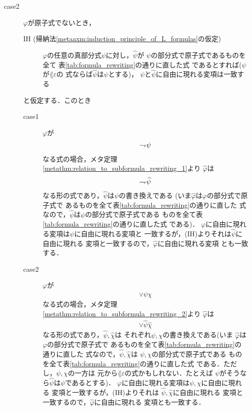 \begin{metaprf}
\begin{description}
\begin{description}
					\item[case2] $\varphi$が原子式でないとき，
						\begin{description}
							\item[IH (帰納法\ref{metaaxm:induction_principle_of_L_formulas}の仮定)]
								$\varphi$の任意の真部分式$\psi$に対し，$\widehat{\psi}$が
								$\psi$の部分式で原子式であるものを全て
								表\ref{tab:formula_rewriting}の通りに直した式
								であるとすれば($\psi$が$\lang{\varepsilon}$の
								式ならば$\widehat{\psi}$は$\psi$とする)，
								$\psi$と$\widehat{\psi}$に自由に現れる変項は一致する
						\end{description}
						と仮定する．このとき
						\begin{description}
							\item[case1] $\varphi$が
								\begin{align}
									\rightharpoondown\hspace{-0.25em} \psi
								\end{align}
								なる式の場合，メタ定理
								\ref{metathm:relation_to_subformula_rewriting_1}より
								$\widehat{\varphi}$は
								\begin{align}
									\rightharpoondown\hspace{-0.25em} \widehat{\psi}
								\end{align}
								なる形の式であり，$\widehat{\psi}$は$\psi$の書き換えである
								(いま$\widehat{\varphi}$は$\varphi$の部分式で原子式で
								あるものを全て表\ref{tab:formula_rewriting}の通りに直した
								式なので，$\widehat{\psi}$は$\psi$の部分式で原子式である
								ものを全て表\ref{tab:formula_rewriting}の通りに直した式
								である)．
								$\varphi$に自由に現れる変項は$\psi$に自由に現れる変項と
								一致するが，(IH)よりそれは$\widehat{\psi}$に自由に現れる
								変項と一致するので，$\widehat{\varphi}$に自由に現れる変項
								とも一致する．
						
							\item[case2] $\varphi$が
								\begin{align}
									\vee \psi \chi
								\end{align}
								なる式の場合，メタ定理
								\ref{metathm:relation_to_subformula_rewriting_2}より
								$\widehat{\varphi}$は
								\begin{align}
									\vee \widehat{\psi} \widehat{\chi}
								\end{align}
								なる形の式であり，$\widehat{\psi},\widehat{\chi}$は
								それぞれ$\psi,\chi$の書き換えである(いま
								$\widehat{\varphi}$は$\varphi$の部分式で原子式で
								あるものを全て表\ref{tab:formula_rewriting}の通りに直した
								式なので，$\widehat{\psi},\widehat{\chi}$は
								$\psi,\chi$の部分式で原子式である
								ものを全て表\ref{tab:formula_rewriting}の通りに直した式
								である．ただし，$\psi,\chi$の一方は
								元から$\lang{\varepsilon}$の式かもしれない．たとえば
								$\psi$がそうなら$\widehat{\psi}$は$\psi$であるとする)．
								$\varphi$に自由に現れる変項は$\psi,\chi$に自由に現れる
								変項と一致するが，(IH)よりそれは
								$\widehat{\psi},\widehat{\chi}$に自由に現れる
								変項と一致するので，$\widehat{\varphi}$に自由に現れる
								変項とも一致する．
					

\end{description}
\end{description}
\end{description}
\end{metaprf}
